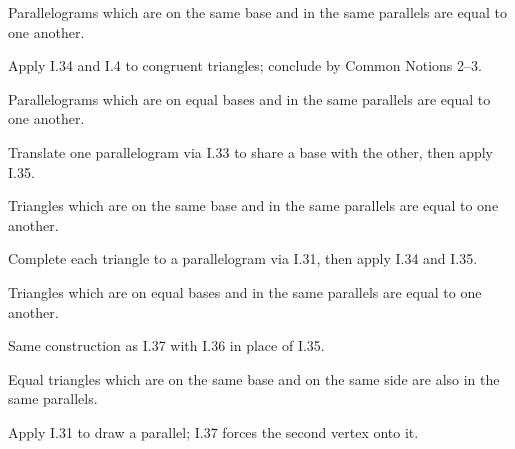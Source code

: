 \documentclass{rrxiv}
\begin{document}
\begin{claim}
\label{prop:I.35}
Parallelograms which are on the same base and in the same parallels
are equal to one another.
\end{claim}
\begin{evidence}[Proof of I.35]
\label{ev:I.35}
Apply I.34 and I.4 to congruent triangles; conclude by Common Notions
2--3.
\end{evidence}

\begin{claim}
\label{prop:I.36}
Parallelograms which are on equal bases and in the same parallels are
equal to one another.
\end{claim}
\begin{evidence}[Proof of I.36]
\label{ev:I.36}
Translate one parallelogram via I.33 to share a base with the other,
then apply I.35.
\end{evidence}

\begin{claim}
\label{prop:I.37}
Triangles which are on the same base and in the same parallels are
equal to one another.
\end{claim}
\begin{evidence}[Proof of I.37]
\label{ev:I.37}
Complete each triangle to a parallelogram via I.31, then apply I.34
and I.35.
\end{evidence}

\begin{claim}
\label{prop:I.38}
Triangles which are on equal bases and in the same parallels are
equal to one another.
\end{claim}
\begin{evidence}[Proof of I.38]
\label{ev:I.38}
Same construction as I.37 with I.36 in place of I.35.
\end{evidence}

\begin{claim}
\label{prop:I.39}
Equal triangles which are on the same base and on the same side are
also in the same parallels.
\end{claim}
\begin{evidence}[Proof of I.39]
\label{ev:I.39}
Apply I.31 to draw a parallel; I.37 forces the second vertex onto it.
\end{evidence}
\end{document}
